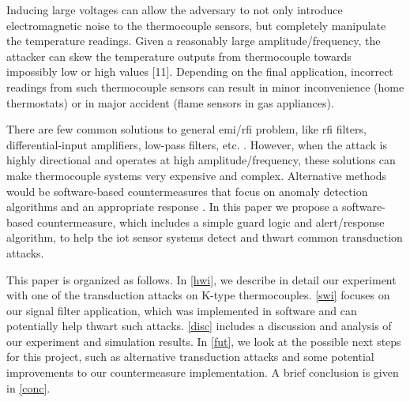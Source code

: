 Inducing large voltages can allow the adversary to not only introduce electromagnetic noise to the thermocouple sensors, but completely manipulate the temperature readings. Given a reasonably large amplitude/frequency, the attacker can skew the temperature outputs from thermocouple towards impossibly low or high values [11]. Depending on the final application, incorrect readings from such thermocouple sensors can result in minor inconvenience (home thermostats) or in major accident (flame sensors in gas appliances). 

There are few common solutions to general \ac{emi}/\ac{rfi} problem, like \ac{rfi} filters, differential-input amplifiers, low-pass filters, etc. \cite{Duff10}. However, when the attack is highly directional and operates at high amplitude/frequency, these solutions can make thermocouple systems very expensive and complex. Alternative methods would be software-based countermeasures that focus on anomaly detection algorithms and an appropriate response \cite{Amitai16}. In this paper we propose a software-based countermeasure, which includes a simple guard logic and alert/response algorithm, to help the \ac{iot} sensor systems detect and thwart common transduction attacks.

This paper is organized as follows. In \cref{hwi}, we describe in detail our experiment with one of the transduction attacks on K-type thermocouples. \cref{swi} focuses on our signal filter application, which was implemented in software and can potentially help thwart such attacks. \cref{disc} includes a discussion and analysis of our experiment and simulation results. In \cref{fut}, we look at the possible next steps for this project, such as alternative transduction attacks and some potential improvements to our countermeasure implementation. A brief conclusion is given in \cref{conc}.











